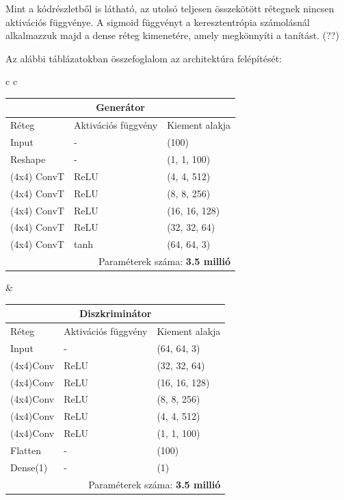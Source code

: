 Mint a kódrészletből is látható, az utolsó teljesen összekötött rétegnek nincsen aktivációs függvénye. A sigmoid függvényt a keresztentrópia számolásnál alkalmazzuk majd a dense réteg kimenetére, amely megkönnyíti a tanítást. (??)

Az alábbi táblázatokban összefoglalom az architektúra felépítését:
\begin{center}

\begin{tabular}{c c}

\scriptsize{
\begin{tabular}{ |p{1.7cm}|p{1.5cm}|p{1.6cm}| }
	\hline
	\multicolumn{3}{|c|}{\textbf{Generátor}} \\
	\hline
	Réteg & Aktivációs függvény & Kiement alakja\\
	\hline
	Input & - & (100)\\
	Reshape & - & (1, 1, 100)\\
	(4x4) ConvT & ReLU & (4, 4, 512)\\
	(4x4) ConvT & ReLU & (8, 8, 256)\\
	(4x4) ConvT & ReLU & (16, 16, 128)\\
	(4x4) ConvT & ReLU & (32, 32, 64)\\
	(4x4) ConvT & tanh & (64, 64, 3)\\
	\hline
	\multicolumn{3}{|r|}{Paraméterek száma: \textbf{3.5 millió}} \\
	\hline
\end{tabular}}

&\scriptsize{
\begin{tabular}{ |p{1.7cm}|p{1.5cm}|p{1.6cm}| }
	\hline
	\multicolumn{3}{|c|}{\textbf{Diszkriminátor}} \\
	\hline
	Réteg & Aktivációs függvény & Kiement alakja\\
	\hline
	Input & - & (64, 64, 3)\\
	(4x4)Conv & ReLU & (32, 32, 64)\\
	(4x4)Conv & ReLU & (16, 16, 128)\\
	(4x4)Conv & ReLU & (8, 8, 256)\\
	(4x4)Conv & ReLU & (4, 4, 512)\\
	(4x4)Conv & ReLU & (1, 1, 100)\\
	Flatten & - & (100)\\
	Dense(1) & - & (1)\\
	\hline
	\multicolumn{3}{|r|}{Paraméterek száma: \textbf{3.5 millió}} \\
	\hline
\end{tabular}}

\end{tabular}
\end{center}

